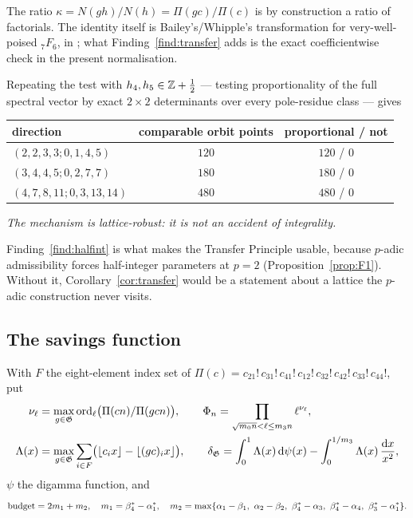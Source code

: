 The ratio $\kappa=N(gh)/N(h)=\Pi(gc)/\Pi(c)$ is by construction a ratio of factorials. The
identity itself is Bailey's/Whipple's transformation for very-well-poised ${}_7F_6$,
\PROVED{} in \cite[Lemmas 7--9]{Zudilin2004}; what Finding~\ref{find:transfer} adds is the
exact coefficientwise check in the present normalisation.

\begin{finding}\label{find:halfint}
 Repeating the test with
$h_4,h_5\in\mathbb{Z}+\tfrac12$ --- testing proportionality of the full spectral vector by exact
$2\times2$ determinants over every pole-residue class --- gives
\begin{center}
\tabsmall
\begin{tabular}{lcc}
\toprule
direction & comparable orbit points & proportional / not\\
\midrule
$(2,2,3,3;0,1,4,5)$ & $120$ & $120$ / $0$\\
$(3,4,4,5;0,2,7,7)$ & $180$ & $180$ / $0$\\
$(4,7,8,11;0,3,13,14)$ & $480$ & $480$ / $0$\\
\bottomrule
\end{tabular}
\end{center}
\emph{The mechanism is lattice-robust: it is not an accident of integrality.}
\end{finding}

Finding~\ref{find:halfint} is what makes the Transfer Principle usable, because
$p$-adic admissibility forces half-integer parameters at $p=2$
(Proposition~\ref{prop:F1}). Without it, Corollary~\ref{cor:transfer} would be a statement
about a lattice the $p$-adic construction never visits.

\subsection{The savings function}\label{ss:savings}

\begin{definition}\label{def:delta}
With $F$ the eight-element index set of
$\Pi(c)=c_{21}!\,c_{31}!\,c_{41}!\,c_{12}!\,c_{32}!\,c_{42}!\,c_{33}!\,c_{44}!$, put
\begin{equation}\label{eq:deltadef}
\begin{aligned}
 \nu_\ell&=\max_{g\in\mathfrak{G}}\operatorname{ord}_\ell\bigl(\Pi(cn)/\Pi(gcn)\bigr),\qquad
 \Phi_n=\prod_{\sqrt{m_0n}<\ell\le m_3n}\ell^{\nu_\ell},\\
 \Lambda(x)&=\max_{g\in\mathfrak{G}}\sum_{i\in F}\bigl(\lfloor c_ix\rfloor-\lfloor(gc)_ix\rfloor\bigr),
 \qquad
 \delta_{\mathfrak{G}}=\int_0^1\Lambda(x)\,\mathrm{d}\psi(x)-\int_0^{1/m_3}\Lambda(x)\,\frac{\mathrm{d} x}{x^2},
\end{aligned}
\end{equation}
$\psi$ the digamma function, and
\begin{equation}\label{eq:budget}
 \bud=2m_1+m_2,\quad m_1=\beta_4^*-\alpha_1^*,\quad
 m_2=\max\{\alpha_1-\beta_1,\ \alpha_2-\beta_2,\ \beta_4^*-\alpha_3,\ \beta_4^*-\alpha_4,\
   \beta_3^*-\alpha_1^*\}.
\end{equation}
\end{definition}

